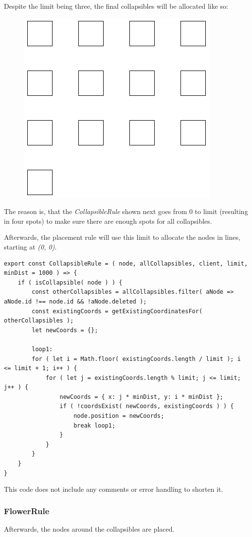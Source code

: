 Despite the limit being three, the final collapsibles will be allocated like so:
\begin{figure}[H]
\centering
\includegraphics[scale=.4]{Bilder/AllocRes.png}
\end{figure}

The reason is, that the \emph{CollapsibleRule} shown next goes from 0 to limit (resulting in four spots) to make sure there are enough spots for all collapsibles.

Afterwards, the placement rule will use this limit to allocate the nodes in lines, starting at \emph{(0, 0)}.
\begin{lstlisting}[caption={Placing all Collapsibles}]
export const CollapsibleRule = ( node, allCollapsibles, client, limit, minDist = 1000 ) => {
	if ( isCollapsible( node ) ) {
		const otherCollapsibles = allCollapsibles.filter( aNode => aNode.id !== node.id && !aNode.deleted );
		const existingCoords = getExistingCoordinatesFor( otherCollapsibles );
		let newCoords = {};

		loop1:
		for ( let i = Math.floor( existingCoords.length / limit ); i <= limit + 1; i++ ) {
			for ( let j = existingCoords.length % limit; j <= limit; j++ ) {
				newCoords = { x: j * minDist, y: i * minDist };
				if ( !coordsExist( newCoords, existingCoords ) ) {
					node.position = newCoords;
					break loop1;
				}
			}
		} 
	}
}
\end{lstlisting}
This code does not include any comments or error handling to shorten it.

\newpage
\subsubsection{FlowerRule}
Afterwards, the nodes around the collapsibles are placed. 

